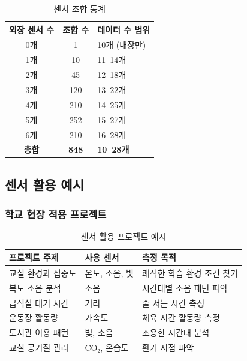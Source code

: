 \documentclass[11pt, a4paper]{article}
\begin{document}
\begin{table}[H]
\centering
\begin{tabularx}{\textwidth}{|c|c|X|}
\hline
\rowcolor{lightgray}
\textbf{외장 센서 수} & \textbf{조합 수} & \textbf{데이터 수 범위} \\
\hline
0개 & 1 & 10개 (내장만) \\
\hline
1개 & 10 & 11~14개 \\
\hline
2개 & 45 & 12~18개 \\
\hline
3개 & 120 & 13~22개 \\
\hline
4개 & 210 & 14~25개 \\
\hline
5개 & 252 & 15~27개 \\
\hline
6개 & 210 & 16~28개 \\
\hline
\textbf{총합} & \textbf{848} & \textbf{10~28개} \\
\hline
\end{tabularx}
\caption{센서 조합 통계}
\end{table}

\newpage

\subsection{센서 활용 예시}

\subsubsection{학교 현장 적용 프로젝트}

\begin{table}[H]
\centering
\begin{tabularx}{\textwidth}{|l|l|X|}
\hline
\rowcolor{lightgray}
\textbf{프로젝트 주제} & \textbf{사용 센서} & \textbf{측정 목적} \\
\hline
교실 환경과 집중도 & 온도, 소음, 빛 & 쾌적한 학습 환경 조건 찾기 \\
\hline
복도 소음 분석 & 소음 & 시간대별 소음 패턴 파악 \\
\hline
급식실 대기 시간 & 거리 & 줄 서는 시간 측정 \\
\hline
운동장 활동량 & 가속도 & 체육 시간 활동량 측정 \\
\hline
도서관 이용 패턴 & 빛, 소음 & 조용한 시간대 분석 \\
\hline
교실 공기질 관리 & CO₂, 온습도 & 환기 시점 파악 \\
\hline
\end{tabularx}
\caption{센서 활용 프로젝트 예시}
\end{table}
\end{document}
